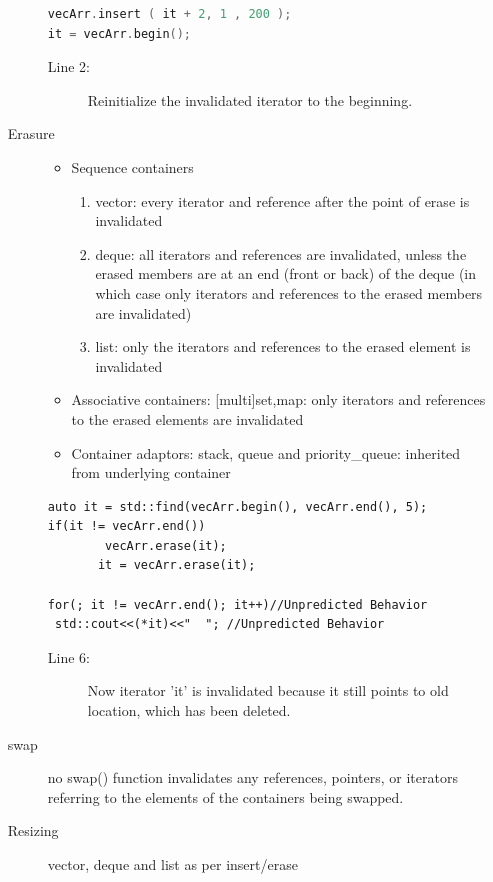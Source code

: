 \documentclass[a4paper,11pt,twoside]{book}
\begin{document}
\begin{itemize}
\begin{description}
\begin{lstlisting}[frame=single, language=c++, mathescape=true]	
vecArr.insert ( it + 2, 1 , 200 );
it = vecArr.begin();
\end{lstlisting}
\begin{description}
	\item[Line 2:] Reinitialize the invalidated iterator to the beginning.
\end{description}

\item[Erasure]
	\begin{itemize}
			\item Sequence containers
					\begin{enumerate}
					\item vector: every iterator and reference after the point of erase is invalidated
					\item deque: all iterators and references are invalidated, unless the erased members are at an end (front or back) of the deque (in which case only iterators and references to the erased members are invalidated)
					\item list: only the iterators and references to the erased element is invalidated
					\end{enumerate}
			
			\item Associative containers: [multi]{set,map}: only iterators and references to the erased elements are invalidated
			
			\item Container adaptors: stack, queue and priority\_queue: inherited from underlying container
	\end{itemize}

\begin{lstlisting}[]
auto it = std::find(vecArr.begin(), vecArr.end(), 5);
if(it != vecArr.end())
        vecArr.erase(it);
       it = vecArr.erase(it);

for(; it != vecArr.end(); it++)//Unpredicted Behavior
 std::cout<<(*it)<<"  "; //Unpredicted Behavior
\end{lstlisting}
\begin{description}
	\item[Line 6:]  Now iterator 'it' is invalidated because it still points to old location, which has been deleted.
\end{description}

\item[swap]
no swap() function invalidates any references, pointers, or iterators referring to the elements of the containers being swapped.

\item[Resizing]
vector, deque and list  as per insert/erase
\end{description}

\end{itemize}
\end{document}
